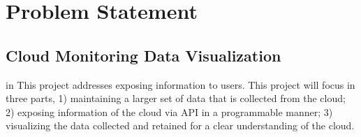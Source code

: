 \section{Problem Statement}
\label{sec:ProblemStatement}



  \subsection{Cloud Monitoring Data Visualization}
in This project addresses exposing information to users. This project will focus in three parts, 1) maintaining a larger set of data that is collected from the cloud; 2) exposing information of the cloud via API in a programmable manner; 3) visualizing the data collected and retained for a clear understanding of the cloud.